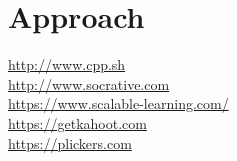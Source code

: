 \documentclass{article}
\begin{document}
%
%
%








\section{Approach} %
\label{sec:plan}

\url{http://www.cpp.sh}\\
\url{http://www.socrative.com}\\
\url{https://www.scalable-learning.com/}\\ %
\url{https://getkahoot.com}\\
\url{https://plickers.com}
\end{document}
